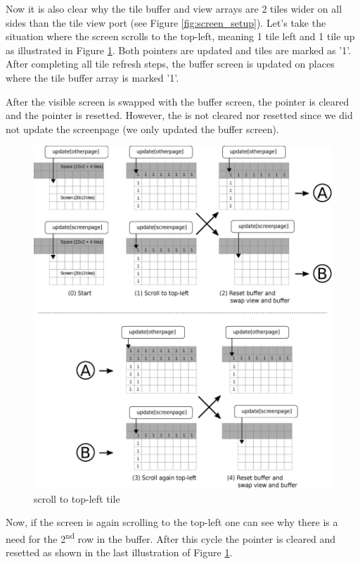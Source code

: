 \documentclass[book.tex]{subfiles}
\begin{document}
\par

Now it is also clear why the tile buffer and view arrays are 2 tiles wider on all sides than the tile view port (see Figure \ref{fig:screen_setup}). Let's take the situation where the screen scrolls to the top-left, meaning 1 tile left and 1 tile up as illustrated in Figure \ref{fig:buffer_tile_move_1}. Both  pointers are updated and tiles are marked as '1'. After completing all tile refresh steps, the buffer screen is updated on places where the tile buffer array is marked '1'. \\
\par
After the visible screen is swapped with the buffer screen, the  pointer is cleared and the pointer is resetted. However, the  is not cleared nor resetted since we did not update the screenpage (we only updated the buffer screen).\\
\begin{figure}[H]
  \centering
  \includegraphics[width=\textwidth]{imgs/drawings/buffer_tile_move.eps}
  \caption{scroll to top-left tile}
  \label{fig:buffer_tile_move_1}
\end{figure}
Now, if the screen is again scrolling to the top-left one can see why there is a need for the 2\textsuperscript{nd} row in the buffer. After this cycle the  pointer is cleared and resetted as shown in the last illustration of Figure \ref{fig:buffer_tile_move_1}.\\
\pagebreak
\end{document}
